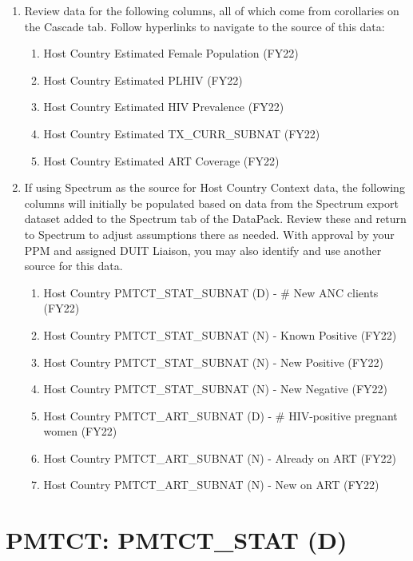\documentclass[
  openany]{book}
\begin{document}
\begin{enumerate}
\def\labelenumi{\arabic{enumi}.}
\item
  Review data for the following columns, all of which come from
  corollaries on the Cascade tab. Follow hyperlinks to navigate to the
  source of this data:

  \begin{enumerate}
  \def\labelenumii{\alph{enumii}.}
  \item
    Host Country Estimated Female Population (FY22)
  \item
    Host Country Estimated PLHIV (FY22)
  \item
    Host Country Estimated HIV Prevalence (FY22)
  \item
    Host Country Estimated TX\_CURR\_SUBNAT (FY22)
  \item
    Host Country Estimated ART Coverage (FY22)
  \end{enumerate}
\item
  If using Spectrum as the source for Host Country Context data, the
  following columns will initially be populated based on data from the
  Spectrum export dataset added to the Spectrum tab of the DataPack.
  Review these and return to Spectrum to adjust assumptions there as
  needed. With approval by your PPM and assigned DUIT Liaison, you may
  also identify and use another source for this data.

  \begin{enumerate}
  \def\labelenumii{\alph{enumii}.}
  \item
    Host Country PMTCT\_STAT\_SUBNAT (D) - \# New ANC clients (FY22)
  \item
    Host Country PMTCT\_STAT\_SUBNAT (N) - Known Positive (FY22)
  \item
    Host Country PMTCT\_STAT\_SUBNAT (N) - New Positive (FY22)
  \item
    Host Country PMTCT\_STAT\_SUBNAT (N) - New Negative (FY22)
  \item
    Host Country PMTCT\_ART\_SUBNAT (D) - \# HIV-positive pregnant
    women (FY22)
  \item
    Host Country PMTCT\_ART\_SUBNAT (N) - Already on ART (FY22)
  \item
    Host Country PMTCT\_ART\_SUBNAT (N) - New on ART (FY22)
  \end{enumerate}
\end{enumerate}

\hypertarget{pmtct-pmtct_stat-d}{%
\section{PMTCT: PMTCT\_STAT (D)}\label{pmtct-pmtct_stat-d}}
\end{document}
